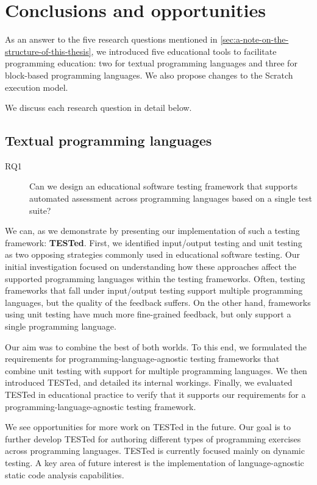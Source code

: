 \documentclass[main]{subfiles}
\begin{document}
\chapter{Conclusions and opportunities}\label{ch:conclusions-and-opportunities}

As an answer to the five research questions mentioned in \cref{sec:a-note-on-the-structure-of-this-thesis},
we introduced five educational tools to facilitate programming education:
two for textual programming languages and three for block-based programming languages.
We also propose changes to the Scratch execution model.

We discuss each research question in detail below.

\section{Textual programming languages}\label{sec:for-textual-programming-languages}

\begin{description}
    \item[RQ1] Can we design an educational software testing framework that supports automated assessment across programming languages based on a single test suite?
\end{description}

We can, as we demonstrate by presenting our implementation of such a testing framework: \textbf{TESTed}.
First, we identified input/output testing and unit testing as two opposing strategies commonly used in educational software testing.
Our initial investigation focused on understanding how these approaches affect the supported programming languages within the testing frameworks.
Often, testing frameworks that fall under input/output testing support multiple programming languages, but the quality of the feedback suffers.
On the other hand, frameworks using unit testing have much more fine-grained feedback, but only support a single programming language.

Our aim was to combine the best of both worlds.
To this end, we formulated the requirements for programming-language-agnostic testing frameworks that combine unit testing with support for multiple programming languages.
We then introduced TESTed, and detailed its internal workings.
Finally, we evaluated TESTed in educational practice to verify that it supports our requirements for a programming-language-agnostic testing framework.

We see opportunities for more work on TESTed in the future.
Our goal is to further develop TESTed for authoring different types of programming exercises across programming languages.
TESTed is currently focused mainly on dynamic testing.
A key area of future interest is the implementation of language-agnostic static code analysis capabilities.
\end{document}
